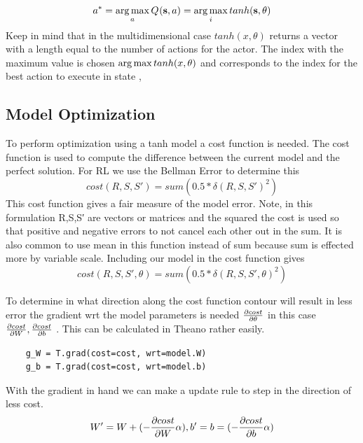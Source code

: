 \begin{equation}
a^{*}= \operatorname*{arg\,max}_{a}Q_{}(\textbf{s},a)= \operatorname*{arg\,max}_{i} tanh(\textbf{s},\theta)
\end{equation}
Keep in mind that in the multidimensional case $tanh(x,\theta)$ returns a vector with a length equal to the number of actions for the actor. The index with the maximum value is chosen $\operatorname*{arg\,max} tanh(x,\theta)$ and corresponds to the index for the best action to execute in state \state,

\subsection{Model Optimization}

To perform optimization using a tanh model a cost function is needed. The cost function is used to compute the difference between the current model and the perfect solution. For RL we use the Bellman Error to determine this
\begin{equation}
cost(R, S, S') = sum(0.5 * \delta(R, S, S')^{2})
\end{equation}
This cost function gives a fair measure of the model error. Note, in this formulation R,S,S′ are vectors or matrices and the squared the cost is used so that positive and negative errors to not cancel each other out in the sum. It is also common to use mean in this function instead of sum because sum is effected more by variable scale. Including our model in the cost function gives
\begin{equation}
cost(R, S, S', \theta) = sum(0.5 * \delta(R, S, S', \theta)^{2})
\end{equation}

To determine in what direction along the cost function contour will result in less error the gradient wrt the model parameters is needed 
$\frac{\partial cost}{\partial \theta}$ in this case $\frac{\partial cost}{\partial W}, \frac{\partial cost}{\partial b}$ . This can be calculated in Theano rather easily.

\begin{lstlisting}
    g_W = T.grad(cost=cost, wrt=model.W)
    g_b = T.grad(cost=cost, wrt=model.b)
\end{lstlisting}

With the gradient in hand we can make a update rule to step in the direction of less cost.
\begin{equation}
	W' = W + (-\frac{\partial cost}{\partial W} \alpha), 
	b' = b = (-\frac{\partial cost}{\partial b} \alpha)
\end{equation} 

